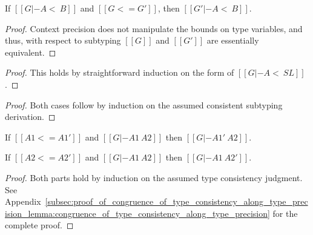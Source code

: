 \begin{lemma}
  \label{lemma:subtyping_context_precision}
  If $[[G |- A <~ B]]$ and $[[G <= G']]$, then $[[G' |- A <~ B]]$.
\end{lemma}
\begin{proof}
  Context precision does not manipulate the bounds on type variables, and thus,
  with respect to subtyping $[[G]]$ and $[[G']]$ are essentially equivalent.
\end{proof}

\begin{proof}
  This holds by straightforward induction on the form of $[[G |- A <~ SL]]$.
\end{proof}

\begin{proof}
  Both cases follow by induction on the assumed consistent subtyping
  derivation.
\end{proof}


\begin{lemma}
  \label{lemma:congruence_of_type_consistency_along_type_precision}
  \begin{enumR}
  \item[] 
  \item If $[[A1 <= A1']]$ and $[[G |- A1 ~ A2]]$ then
    $[[G |- A1' ~ A2]]$.
    
  \item If $[[A2 <= A2']]$ and $[[G |- A1 ~ A2]]$ then
    $[[G |- A1 ~ A2']]$.  
  \end{enumR}
\end{lemma}
\begin{proof}
  Both parts hold by induction on the assumed type consistency
  judgment.  See
  Appendix~\ref{subsec:proof_of_congruence_of_type_consistency_along_type_precision_lemma:congruence_of_type_consistency_along_type_precision}
  for the complete proof.
\end{proof}

